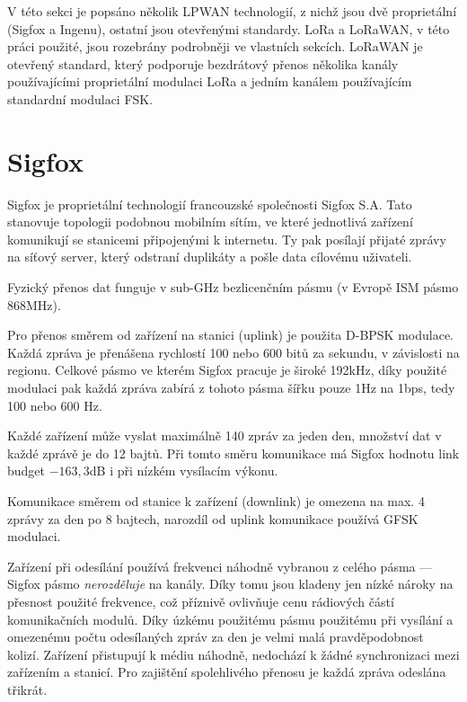 V této sekci je popsáno několik LPWAN technologií, z nichž jsou dvě 
proprietální (Sigfox a Ingenu), ostatní jsou otevřenými standardy. LoRa a 
LoRaWAN, v této práci použité, jsou rozebrány podrobněji ve vlastních sekcích. 
LoRaWAN je otevřený standard, který podporuje bezdrátový přenos několika kanály
používajícími proprietální modulaci LoRa a jedním kanálem používajícím 
standardní modulaci FSK.

\section{Sigfox}

Sigfox je proprietální technologií francouzské společnosti Sigfox S.A. Tato 
stanovuje topologii podobnou mobilním sítím, ve které jednotlivá zařízení 
komunikují se stanicemi připojenými k internetu. Ty pak posílají přijaté zprávy 
na síťový server, který odstraní duplikáty a pošle data cílovému uživateli.

Fyzický přenos dat funguje v sub-GHz bezlicenčním pásmu (v Evropě ISM pásmo 
868MHz).

Pro přenos směrem od zařízení na stanici (uplink) je použita D-BPSK modulace. 
Každá zpráva je přenášena rychlostí 100 nebo 600 bitů za sekundu, v závislosti 
na regionu. Celkové pásmo ve kterém Sigfox pracuje je široké 192kHz, díky 
použité modulaci pak každá zpráva zabírá z tohoto pásma šířku pouze 1Hz na 1bps, 
tedy 100 nebo 600 Hz.

Každé zařízení může vyslat maximálně 140 zpráv za jeden den, množství dat v 
každé zprávě je do 12 bajtů. Při tomto směru komunikace má Sigfox hodnotu link 
budget $-163,3$dB i při nízkém vysílacím výkonu.

Komunikace směrem od stanice k zařízení (downlink) je omezena na max. 4 zprávy 
za den po 8 bajtech, narozdíl od uplink komunikace používá GFSK modulaci.

Zařízení při odesílání používá frekvenci náhodně vybranou z celého pásma --- 
Sigfox pásmo \emph{nerozděluje} na kanály. Díky tomu jsou kladeny jen nízké 
nároky na přesnost použité frekvence, což příznivě ovlivňuje cenu rádiových částí komunikačních
modulů. Díky úzkému použitému pásmu použitému při vysílání a omezenému počtu 
odesílaných zpráv za den je velmi malá pravděpodobnost kolizí. Zařízení 
přistupují k médiu náhodně, nedochází k žádné synchronizaci mezi zařízením a 
stanicí. Pro zajištění spolehlivého přenosu je každá zpráva odeslána třikrát.

